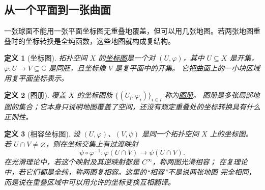 \documentclass[UTF8,fontset=none,a4paper,11pt]{ctexart}
\theoremstyle{foundation-definition}
\newtheorem{definition}{定义}[section]
\theoremstyle{foundation-theorem}
\theoremstyle{foundation-proposition}
\theoremstyle{foundation-example}
\theoremstyle{foundation-remark}
\theoremstyle{foundation-theorem}
\newcommand{\C}{\mathbb C}
\newcommand{\term}[2]{\hyperref[#1]{#2}}
\begin{document}
\thispagestyle{fancy}
\subsection{从一个平面到一张曲面}

一张球面不能用一张平面坐标图无重叠地覆盖，但可以用几张地图。若两张地图重叠时的坐标转换是全纯函数，这些地图就构成复结构。

\begin{center}
\centering
{}
\label{fig:complex-atlas}
\end{center}

\begin{definition}[坐标图]\label{def:coordinate-chart}
拓扑空间 \(X\) 的\term{def:coordinate-chart}{坐标图}是一个对 \((U,\varphi)\)，其中
\(U\subseteq X\) 是开集，\(\varphi:U\to V\subseteq\mathbb C\) 是同胚，且坐标像 \(V\) 是复平面中的开集。
它把曲面上的一小块区域用复平面坐标表示。
\end{definition}

\begin{definition}[图册]\label{def:atlas}
覆盖 \(X\) 的坐标图族 \(\{(U_i,\varphi_i)\}_{i\in I}\) 称为\term{def:atlas}{图册}。
图册是多张局部地图的集合；它本身只说明地图覆盖了空间，还没有规定重叠处的坐标转换具有什么正则性。
\end{definition}

\begin{definition}[相容坐标图]\label{def:compatible-charts}
设 \((U,\varphi)\)、\((V,\psi)\) 是同一个拓扑空间 \(X\) 上的坐标图。
若 \(U\cap V\ne\varnothing\)，则在坐标交集上有过渡映射
\[
\psi\circ\varphi^{-1}:
\varphi(U\cap V)\longrightarrow\psi(U\cap V).
\]
在光滑理论中，若这个映射及其逆映射都是 \(C^\infty\)，称两图光滑相容；
在复理论中，若它们都是全纯，称两图复相容。这里的“相容”不是说两张地图
完全相同，而是说在重叠区域中可以用允许的坐标变换互相翻译。
\end{definition}
\end{document}
